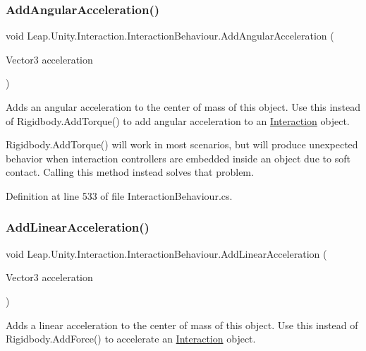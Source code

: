 \subsubsection{\texorpdfstring{AddAngularAcceleration()}{AddAngularAcceleration()}}
{\footnotesize\ttfamily void Leap.\+Unity.\+Interaction.\+Interaction\+Behaviour.\+Add\+Angular\+Acceleration (\begin{DoxyParamCaption}\item[{Vector3}]{acceleration }\end{DoxyParamCaption})}



Adds an angular acceleration to the center of mass of this object. Use this instead of Rigidbody.\+Add\+Torque() to add angular acceleration to an \mbox{\hyperlink{namespace_leap_1_1_unity_1_1_interaction}{Interaction}} object. 

Rigidbody.\+Add\+Torque() will work in most scenarios, but will produce unexpected behavior when interaction controllers are embedded inside an object due to soft contact. Calling this method instead solves that problem. 

Definition at line 533 of file Interaction\+Behaviour.\+cs.

\mbox{\label{class_leap_1_1_unity_1_1_interaction_1_1_interaction_behaviour_ad7c8cdc8d52f0de4d0036a76855b8926}} 
\subsubsection{\texorpdfstring{AddLinearAcceleration()}{AddLinearAcceleration()}}
{\footnotesize\ttfamily void Leap.\+Unity.\+Interaction.\+Interaction\+Behaviour.\+Add\+Linear\+Acceleration (\begin{DoxyParamCaption}\item[{Vector3}]{acceleration }\end{DoxyParamCaption})}



Adds a linear acceleration to the center of mass of this object. Use this instead of Rigidbody.\+Add\+Force() to accelerate an \mbox{\hyperlink{namespace_leap_1_1_unity_1_1_interaction}{Interaction}} object. 

